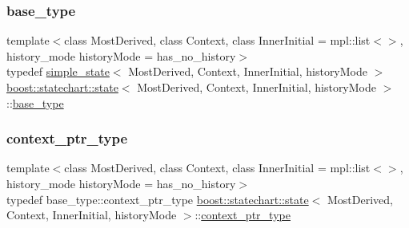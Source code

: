 \subsubsection{\texorpdfstring{base\+\_\+type}{base\_type}}
{\footnotesize\ttfamily template$<$class Most\+Derived, class Context, class Inner\+Initial = mpl\+::list$<$$>$, history\+\_\+mode history\+Mode = has\+\_\+no\+\_\+history$>$ \\
typedef \mbox{\hyperlink{classboost_1_1statechart_1_1simple__state}{simple\+\_\+state}}$<$ Most\+Derived, Context, Inner\+Initial, history\+Mode $>$ \mbox{\hyperlink{classboost_1_1statechart_1_1state}{boost\+::statechart\+::state}}$<$ Most\+Derived, Context, Inner\+Initial, history\+Mode $>$\+::\mbox{\hyperlink{classboost_1_1statechart_1_1simple__state_a0a4e135c0eb6d114bd2e3e6e61ea3d5f}{base\+\_\+type}}\hspace{0.3cm}{\ttfamily [private]}}

\mbox{\label{classboost_1_1statechart_1_1state_a7335c17e6e761eb1b50acdc383fbc080}} 
\subsubsection{\texorpdfstring{context\+\_\+ptr\+\_\+type}{context\_ptr\_type}}
{\footnotesize\ttfamily template$<$class Most\+Derived, class Context, class Inner\+Initial = mpl\+::list$<$$>$, history\+\_\+mode history\+Mode = has\+\_\+no\+\_\+history$>$ \\
typedef base\+\_\+type\+::context\+\_\+ptr\+\_\+type \mbox{\hyperlink{classboost_1_1statechart_1_1state}{boost\+::statechart\+::state}}$<$ Most\+Derived, Context, Inner\+Initial, history\+Mode $>$\+::\mbox{\hyperlink{classboost_1_1statechart_1_1simple__state_ac7e361322d53b3f57976ff23056b59e7}{context\+\_\+ptr\+\_\+type}}}

\mbox{\label{classboost_1_1statechart_1_1state_a4e7f8d979b4f7fcd77ab558f999e8d22}} 

